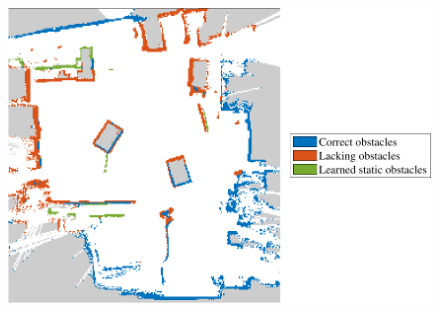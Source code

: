\begin{figure}
\centering
\includegraphics[scale=1]{chapters/evaluation/figures/static_classified_localization_test-crop}
\caption{}
\label{fig:static_classified_localization_test-crop}
\end{figure}
